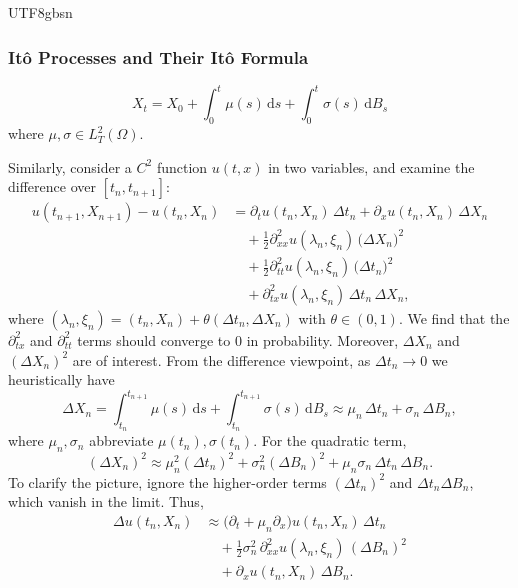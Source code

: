 \documentclass{article}
\begin{document}
\begin{CJK*}{UTF8}{gbsn}
\subsubsection{Itô Processes and Their Itô Formula}
\begin{definition}
    \begin{equation}
    X_t=X_0+\int_0^t \mu(s)\,\mathrm{d}s+\int_0^t \sigma(s)\,\mathrm{d}B_s
    \label{ito pro}
    \end{equation}
    where $\mu,\sigma\in L^2_T(\Omega)$.
\end{definition}

Similarly, consider a $C^2$ function $u(t,x)$ in two variables, and examine the difference over $[t_n,t_{n+1}]$:
$$
\begin{aligned}
    u(t_{n+1},X_{n+1})-u(t_{n},X_{n})
    &=\partial_t u(t_{n},X_{n})\,\Delta t_n+\partial_x u(t_{n},X_{n})\,\Delta X_n\\
    &\quad+\frac{1}{2}\partial_{xx}^2 u(\lambda_n,\xi_n)\,\big(\Delta X_n\big)^2\\
    &\quad+\frac{1}{2}\partial_{tt}^2 u(\lambda_n,\xi_n)\,\big(\Delta t_n\big)^2\\
    &\quad+\partial_{tx}^2 u(\lambda_n,\xi_n)\,\Delta t_n\,\Delta X_n,
\end{aligned}
$$
where $(\lambda_n,\xi_n)=(t_n,X_n)+\theta(\Delta t_n,\Delta X_n)$ with $\theta\in(0,1)$. We find that the $\partial_{tx}^2$ and $\partial_{tt}^2$ terms should converge to $0$ in probability. Moreover, $\Delta X_n$ and $(\Delta X_n)^2$ are of interest. From the difference viewpoint, as $\Delta t_n\to0$ we heuristically have
$$
\Delta X_n=\int_{t_n}^{t_{n+1}}\mu(s)\,\mathrm{d}s+\int_{t_n}^{t_{n+1}}\sigma(s)\,\mathrm{d}B_s
\approx \mu_n\,\Delta t_n+\sigma_n\,\Delta B_n,
$$
where $\mu_n,\sigma_n$ abbreviate $\mu(t_n),\sigma(t_n)$. For the quadratic term,
$$
(\Delta X_n)^2
\approx \mu_n^2(\Delta t_n)^2+\sigma_n^2(\Delta B_n)^2+\mu_n\sigma_n\,\Delta t_n\,\Delta B_n.
$$
To clarify the picture, ignore the higher-order terms $(\Delta t_n)^2$ and $\Delta t_n\Delta B_n$, which vanish in the limit. Thus,
$$
\begin{aligned}
    \Delta u(t_n,X_n)
    &\approx\big(\partial_t+\mu_n\partial_x\big)u(t_{n},X_{n})\,\Delta t_n\\ 
    &\quad+\frac{1}{2}\sigma_n^2\,\partial_{xx}^2 u(\lambda_{n},\xi_{n})\,(\Delta B_n)^2\\
    &\quad+\partial_x u(t_{n},X_{n})\,\Delta B_n.
\end{aligned}
$$


\end{CJK*}
\end{document}
